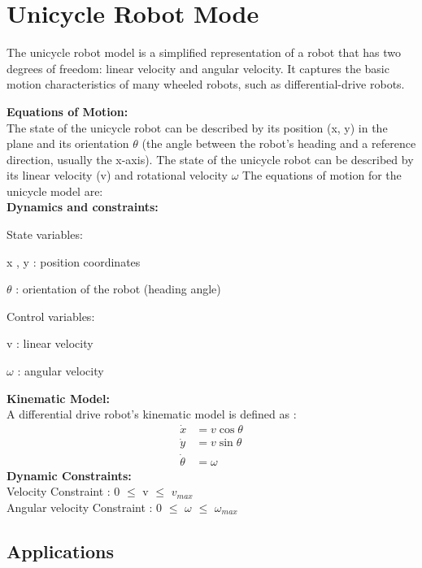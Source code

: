 \documentclass[9pt,a4paper,twoside]{rho-class/rho}
\begin{document}
\section{Unicycle Robot Mode}

    The unicycle robot model is a simplified representation of a robot that has two degrees of freedom: linear velocity and angular velocity. It captures the basic motion characteristics of many wheeled robots, such as differential-drive robots.


    \textbf{Equations of Motion:}\\
     The state of the unicycle robot can be described by its position (x, y) in the plane and its orientation $\theta$ (the angle between the robot's heading and a reference direction, usually the x-axis). The state of the unicycle robot can be described by its linear velocity (v) and rotational velocity $\omega$ The equations of motion for the unicycle model are: \\
     
     \textbf{Dynamics and constraints:}
     
     State variables:
     
       x , y : position coordinates 
       
       $\theta$ : orientation of the robot (heading angle)
       
     Control variables:
     
       v : linear velocity
       
       $\omega$ : angular velocity

     
     \textbf{Kinematic Model:} \\
     A differential drive robot’s kinematic model is defined as :
     \begin{align*}
         \Dot{x}& = v\cos{\theta}\\
         \Dot{y}& = v\sin{\theta}\\
         \Dot{\theta}& = \omega
     \end{align*}
    \textbf{Dynamic Constraints:}\\
    Velocity Constraint :         0 $\leq$ v $\leq$ $v_{max}$ \\
    Angular velocity Constraint : 0 $\leq$ $\omega$ $\leq$ $\omega_{max}$\\

    \subsection{Applications}
\end{document}
